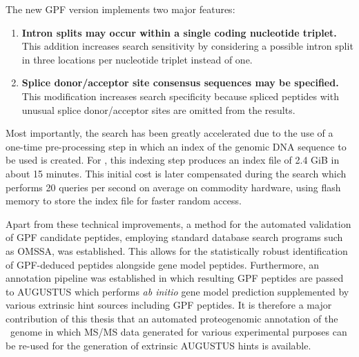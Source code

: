 The new GPF version implements two major features:

\begin{enumerate}
\item {\bf Intron splits may occur within a single coding nucleotide triplet.}
This addition increases search sensitivity by considering a possible intron
split in three locations per nucleotide triplet instead of one.

\item {\bf Splice donor/acceptor site consensus sequences may be specified.} 
This modification increases search specificity because spliced peptides with
unusual splice donor/acceptor sites are omitted from the results.
\end{enumerate}

Most importantly, the search has been greatly accelerated due to the use
of a one-time pre-processing step in which an index of the genomic DNA sequence
to be used is created.
For \cre, this indexing step produces an index file of 2.4 GiB in about 15 
minutes.
This initial cost is later compensated during the search which performs
20 queries per second on average on commodity hardware, using flash memory to 
store the index file for faster random access.

Apart from these technical improvements, a method for the automated validation 
of GPF candidate peptides, employing standard database search programs such as 
OMSSA, was established.
This allows for the statistically robust identification of GPF-deduced peptides
alongside gene model peptides.
Furthermore, an annotation pipeline was established in which resulting GPF
peptides are passed to AUGUSTUS which performs {\em ab initio} gene 
model prediction supplemented by various extrinsic hint sources including
GPF peptides.
It is therefore a major contribution of this thesis that an automated
proteogenomic annotation of the \cre~genome in which MS/MS data generated
for various experimental purposes can be re-used for the generation of
extrinsic AUGUSTUS hints is available.

